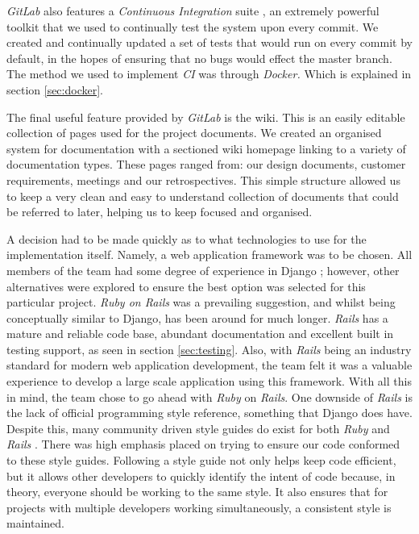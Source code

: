 \documentclass{l3proj}
\begin{document}
\textit{GitLab} also features a \textit{Continuous Integration} suite \cite{ci}, an extremely powerful toolkit that we used to continually test the system upon every commit. We created and continually updated a set of tests that would run on every commit by default, in the hopes of ensuring that no bugs would effect the master branch. The method we used to implement \textit{CI} was through \textit{Docker.} Which is explained in section \ref{sec:docker}.

The final useful feature provided by \textit{GitLab} is the wiki. This is an easily editable collection of pages used for the project documents. We created an organised system for documentation with a sectioned wiki homepage linking to a variety of documentation types. These pages ranged from: our design documents, customer requirements, meetings and our retrospectives. This simple structure allowed us to keep a very clean and easy to understand collection of documents that could be referred to later, helping us to keep focused and organised.

A decision had to be made quickly as to what technologies to use for the implementation itself. Namely, a web application framework was to be chosen. All members of the team had some degree of experience in Django \cite{django-overview}; however, other alternatives were explored to ensure the best option was selected for this particular project. \textit{Ruby on Rails}\cite{rails-doctrine} was a prevailing suggestion, and whilst being conceptually similar to Django, has been around for much longer\cite{django-vs-rails}. \textit{Rails} has a mature and reliable code base, abundant documentation and excellent built in testing support, as seen in section \ref{sec:testing}. Also, with \textit{Rails} being an industry standard for modern web application development, the team felt it was a valuable experience to develop a large scale application using this framework. With all this in mind, the team chose to go ahead with \textit{Ruby} on \textit{Rails}. One downside of \textit{Rails} is the lack of official programming style reference, something that Django does have. Despite this, many community driven style guides do exist for both \textit{Ruby} \cite{ruby-style-guide} and \textit{Rails} \cite{rails-style-guide}. There was high emphasis placed on trying to ensure our code conformed to these style guides. Following a style guide not only helps keep code efficient, but it allows other developers to quickly identify the intent of code because, in theory, everyone should be working to the same style. It also ensures that for projects with multiple developers working simultaneously, a consistent style is maintained.
\end{document}
